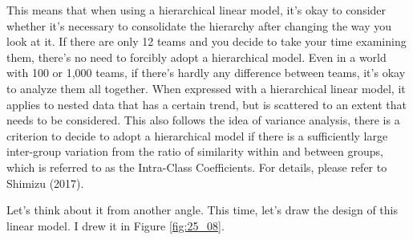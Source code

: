 \documentclass{ltjsbook}
\begin{document}
This means that when using a hierarchical linear model, it's okay to consider whether it's necessary to consolidate the hierarchy after changing the way you look at it. If there are only 12 teams and you decide to take your time examining them, there's no need to forcibly adopt a hierarchical model. Even in a world with 100 or 1,000 teams, if there's hardly any difference between teams, it's okay to analyze them all together. When expressed with a hierarchical linear model, it applies to nested data that has a certain trend, but is scattered to an extent that needs to be considered. This also follows the idea of variance analysis, there is a criterion to decide to adopt a hierarchical model if there is a sufficiently large inter-group variation from the ratio of similarity within and between groups, which is referred to as the Intra-Class Coefficients. For details, please refer to Shimizu (2017).

Let's think about it from another angle. This time, let's draw the design of this linear model. I drew it in Figure \ref{fig:25_08}.

\end{document}
